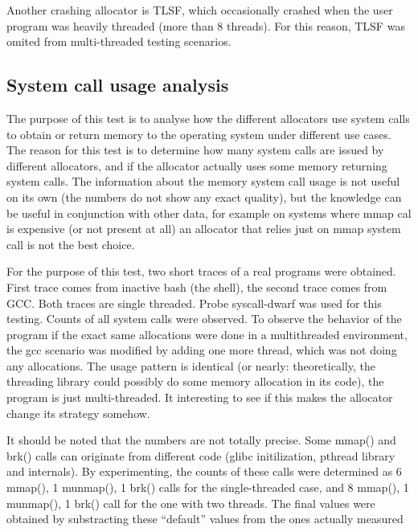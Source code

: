 Another crashing allocator is TLSF, which occasionally crashed when the user program was heavily threaded (more than 8 threads). For this reason, TLSF was omited from multi-threaded testing scenarios.

\subsection{System call usage analysis}

The purpose of this test is to analyse how the different allocators use system calls to obtain or return memory to the operating system under different use cases. The reason for this test is to determine how many system calls are issued by different allocators, and if the allocator actually uses some memory returning system calls. The information about the memory system call usage is not useful on its own (the numbers do not show any exact quality), but the knowledge can be useful in conjunction with other data, for example on systems where mmap cal is expensive (or not present at all) an allocator that relies just on mmap system call is not the best choice.

For the purpose of this test, two short traces of a real programs were obtained. First trace comes from inactive bash (the shell), the second trace comes from GCC. Both traces are single threaded. Probe syscall-dwarf was used for this testing. Counts of all system calls were observed. To observe the behavior of the program if the exact same allocations were done in a multithreaded environment, the gcc scenario was modified by adding one more thread, which was not doing any allocations. The usage pattern is identical (or nearly: theoretically, the threading library could possibly do some memory allocation in its code), the program is just multi-threaded. It interesting to see if this makes the allocator change its strategy somehow.

It should be noted that the numbers are not totally precise. Some mmap() and brk() calls can originate from different code (glibc initilization, pthread library and internals). By experimenting, the counts of these calls were determined as 6 mmap(), 1 munmap(), 1 brk() calls for the single-threaded case, and 8 mmap(), 1 munmap(), 1 brk() call for the one with two threads. The final values were obtained by substracting these ``default'' values from the ones actually measured

